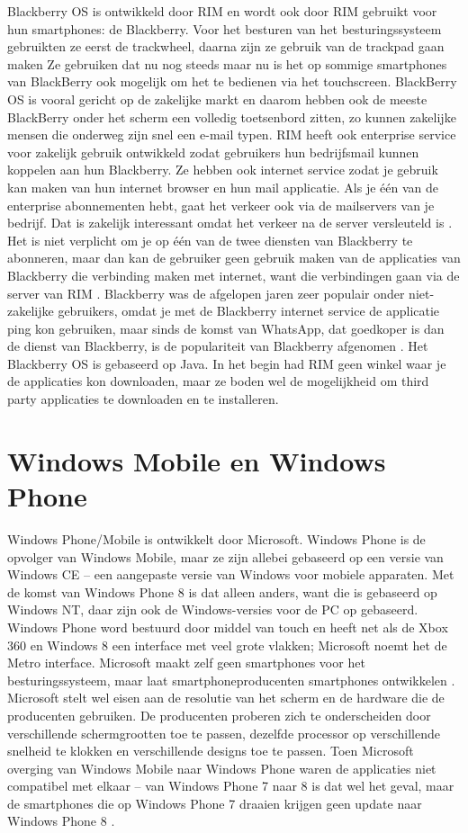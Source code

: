 Blackberry OS is ontwikkeld door RIM en wordt ook door RIM gebruikt voor hun smartphones: de Blackberry.
Voor het besturen van het besturingssysteem gebruikten ze eerst de track\-wheel, daarna zijn ze gebruik van de trackpad gaan maken
Ze gebruiken dat nu nog steeds maar nu is het op sommige smartphones van BlackBerry ook mogelijk om het te bedienen via het touch\-screen.
BlackBerry OS is vooral gericht op de zakelijke markt en daarom hebben ook de meeste BlackBerry onder het scherm een volledig toetsenbord zitten, zo kunnen zakelijke mensen die onderweg zijn snel een e-mail typen.
RIM heeft ook enterprise service voor zakelijk gebruik ontwikkeld zodat gebruikers hun bedrijfsmail kunnen koppelen aan hun Blackberry.
Ze hebben ook internet service zodat je gebruik kan maken van hun internet browser en hun mail applicatie.
Als je \'e\'en van de enterprise abonnementen hebt, gaat het verkeer ook via de mailservers van je bedrijf.
Dat is zakelijk interessant omdat het verkeer na de server versleuteld is \citep{webwereld}.
Het is niet verplicht om je op \'e\'en van de twee diensten van Blackberry te abonneren, maar dan kan de gebruiker geen gebruik maken van de applicaties van Blackberry die verbinding maken met internet, want die verbindingen gaan via de server van RIM \citep{wikipedia}.
Blackberry was de afgelopen jaren zeer populair onder niet-zakelijke gebruikers, omdat je met de Blackberry internet service de applicatie ping kon gebruiken, maar sinds de komst van WhatsApp, dat goedkoper is dan de dienst van Blackberry, is de populariteit van Blackberry afgenomen \citep{consumentenbond}.
Het Blackberry OS is gebaseerd op Java.
In het begin had RIM geen winkel waar je de applicaties kon downloaden, maar ze boden wel de mogelijkheid om third party applicaties te downloaden en te installeren.

\section{Windows Mobile en Windows Phone}

Windows Phone/Mobile is ontwikkelt door Microsoft.
Windows Phone is de opvolger van Windows Mobile, maar ze zijn allebei gebaseerd op een versie van Windows CE -- een aangepaste versie van Windows voor mobiele apparaten.
Met de komst van Windows Phone 8 is dat alleen anders, want die is gebaseerd op Windows NT, daar zijn ook de Windows-versies voor de PC op gebaseerd.
Windows Phone word bestuurd door middel van touch en heeft net als de Xbox 360 en Windows 8 een interface met veel grote vlakken; Microsoft noemt het de Metro interface.
Microsoft maakt zelf geen smartphones voor het besturingssysteem, maar laat smartphoneproducenten smartphones ontwikkelen \citep{nrc}.
Microsoft stelt wel eisen aan de resolutie van het scherm en de hardware die de producenten gebruiken.
De producenten proberen zich te onderscheiden door verschillende schermgrootten toe te passen, dezelfde processor op verschillende snelheid te klokken en verschillende designs toe te passen.
Toen Microsoft overging van Windows Mobile naar Windows Phone waren de applicaties niet compatibel met elkaar -- van Windows Phone 7 naar 8 is dat wel het geval, maar de smartphones die op Windows Phone 7 draaien krijgen geen update naar Windows Phone 8 \citep{tweakers}.
 
 
